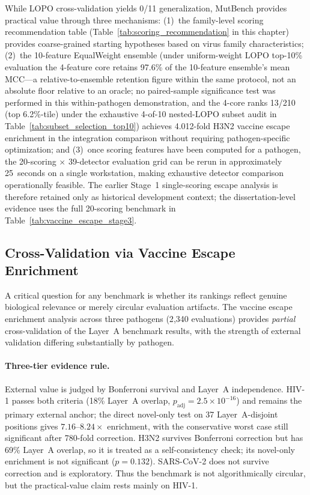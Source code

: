 While LOPO cross-validation yields 0/11 generalization, MutBench provides practical value through three mechanisms: (1)~the family-level scoring recommendation table (Table~\ref{tab:scoring_recommendation} in this chapter) provides coarse-grained starting hypotheses based on virus family characteristics; (2)~the 10-feature EqualWeight ensemble (under uniform-weight LOPO top-10\% evaluation the 4-feature core retains 97.6\% of the 10-feature ensemble's mean MCC---a relative-to-ensemble retention figure within the same protocol, not an absolute floor relative to an oracle; no paired-sample significance test was performed in this within-pathogen demonstration, and the 4-core ranks 13/210 (top 6.2\%-tile) under the exhaustive 4-of-10 nested-LOPO subset audit in Table~\ref{tab:subset_selection_top10}) achieves 4.012-fold H3N2 vaccine escape enrichment in the integration comparison without requiring pathogen-specific optimization; and (3)~once scoring features have been computed for a pathogen, the 20-scoring $\times$ 39-detector evaluation grid can be rerun in approximately 25~seconds on a single workstation, making exhaustive detector comparison operationally feasible.
The earlier Stage~1 single-scoring escape analysis is therefore retained only as historical development context; the dissertation-level evidence uses the full 20-scoring benchmark in Table~\ref{tab:vaccine_escape_stage3}.

\subsection{Cross-Validation via Vaccine Escape Enrichment}
\label{sec:cross_validation_escape}

A critical question for any benchmark is whether its rankings reflect genuine biological relevance or merely circular evaluation artifacts.
The vaccine escape enrichment analysis across three pathogens (2{,}340 evaluations) provides \emph{partial} cross-validation of the Layer~A benchmark results, with the strength of external validation differing substantially by pathogen.

\paragraph{Three-tier evidence rule.}
External value is judged by Bonferroni survival and Layer~A independence.
HIV-1 passes both criteria (18\% Layer~A overlap, $p_{\text{adj}} = 2.5 \times 10^{-16}$) and remains the primary external anchor; the direct novel-only test on 37 Layer~A-disjoint positions gives $7.16\text{--}8.24\times$ enrichment, with the conservative worst case still significant after 780-fold correction.
H3N2 survives Bonferroni correction but has 69\% Layer~A overlap, so it is treated as a self-consistency check; its novel-only enrichment is not significant ($p=0.132$).
SARS-CoV-2 does not survive correction and is exploratory.
Thus the benchmark is not algorithmically circular, but the practical-value claim rests mainly on HIV-1.

